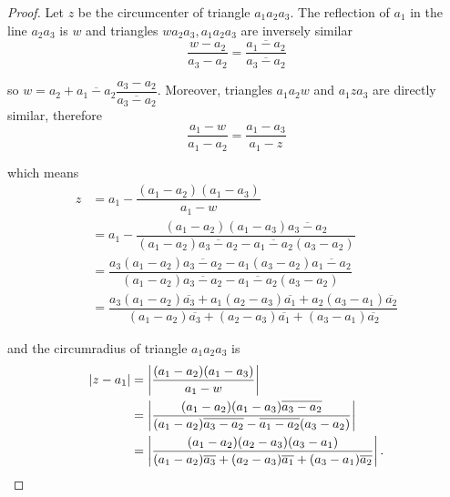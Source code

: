 \begin{proof}
	Let \( z \) be the circumcenter of triangle \( a_{1}a_{2}a_{3} \). The reflection of \( a_{1} \) in the line \( a_{2}a_{3} \) is \( w \) and triangles \( wa_{2}a_{3}, a_{1}a_{2}a_{3} \) are inversely similar
	\[
		\dfrac{w - a_{2}}{a_{3} - a_{2}} = \dfrac{\overline{a_{1} - a_{2}}}{\overline{a_{3} - a_{2}}}
	\]

	so \( w = a_{2} + \overline{a_{1} - a_{2}}\dfrac{a_{3} - a_{2}}{\overline{a_{3} - a_{2}}} \). Moreover, triangles \( a_{1}a_{2}w \) and \( a_{1}za_{3} \) are directly similar, therefore
	\[
		\dfrac{a_{1} - w}{a_{1} - a_{2}} = \dfrac{a_{1} - a_{3}}{a_{1} - z}
	\]

	which means
	\begingroup
	\allowdisplaybreaks%
	\begin{align*}
		z & = a_{1} - \dfrac{(a_{1} - a_{2})(a_{1} - a_{3})}{a_{1} - w}                                                                                                                                                                       \\
		  & = a_{1} - \dfrac{(a_{1} - a_{2})(a_{1} - a_{3})\overline{a_{3} - a_{2}}}{(a_{1} - a_{2})\overline{a_{3} - a_{2}} - \overline{a_{1} - a_{2}}(a_{3} - a_{2})}                                                                       \\
		  & = \dfrac{a_{3}(a_{1} - a_{2})\overline{a_{3} - a_{2}} - a_{1}(a_{3} - a_{2})\overline{a_{1} - a_{2}}}{(a_{1} - a_{2})\overline{a_{3} - a_{2}} - \overline{a_{1} - a_{2}}(a_{3} - a_{2})}                                          \\
		  & = \dfrac{a_{3}(a_{1} - a_{2})\overline{a_{3}} + a_{1}(a_{2} - a_{3})\overline{a_{1}} + a_{2}(a_{3} - a_{1})\overline{a_{2}}}{(a_{1} - a_{2})\overline{a_{3}} + (a_{2} - a_{3})\overline{a_{1}} + (a_{3} - a_{1})\overline{a_{2}}}
	\end{align*}
	\endgroup

	and the circumradius of triangle \( a_{1}a_{2}a_{3} \) is
	\begingroup
	\allowdisplaybreaks%
	\begin{align*}
		\left\vert z - a_{1} \right\vert & = \left\vert \dfrac{(a_{1} - a_{2})(a_{1} - a_{3})}{a_{1} - w}  \right\vert                                                                                                                  \\
		                                 & = \left\vert \dfrac{(a_{1} - a_{2})(a_{1} - a_{3})\overline{a_{3} - a_{2}}}{(a_{1} - a_{2})\overline{a_{3} - a_{2}} - \overline{a_{1} - a_{2}}(a_{3} - a_{2})} \right\vert                   \\
		                                 & = \left\vert \dfrac{(a_{1} - a_{2})(a_{2} - a_{3})(a_{3} - a_{1})}{(a_{1} - a_{2})\overline{a_{3}} + (a_{2} - a_{3})\overline{a_{1}} + (a_{3} - a_{1})\overline{a_{2}}} \right\vert.\qedhere
	\end{align*}
	\endgroup
\end{proof}


